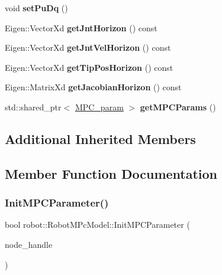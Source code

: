 \begin{DoxyCompactItemize}
void {\bfseries set\+Pu\+Dq} ()
\item 
\mbox{\label{classrobot_1_1_robot_m_pc_model_af5e8ec74e912741c4a0c51d5b06b8e5b}} 
Eigen\+::\+Vector\+Xd {\bfseries get\+Jnt\+Horizon} () const
\item 
\mbox{\label{classrobot_1_1_robot_m_pc_model_a1988ea2ad3f980211b70ed941dc12abc}} 
Eigen\+::\+Vector\+Xd {\bfseries get\+Jnt\+Vel\+Horizon} () const
\item 
\mbox{\label{classrobot_1_1_robot_m_pc_model_aeaf76924dc1770af2907a307f6884011}} 
Eigen\+::\+Vector\+Xd {\bfseries get\+Tip\+Pos\+Horizon} () const
\item 
\mbox{\label{classrobot_1_1_robot_m_pc_model_a1ac879f58cc1181388e1938ed64d8029}} 
Eigen\+::\+Matrix\+Xd {\bfseries get\+Jacobian\+Horizon} () const
\item 
\mbox{\label{classrobot_1_1_robot_m_pc_model_a373adb05c06bb6cce280dc9aa3980167}} 
std\+::shared\+\_\+ptr$<$ \hyperlink{structrobot_1_1_m_p_c__param}{M\+P\+C\+\_\+param} $>$ {\bfseries get\+M\+P\+C\+Params} ()
\end{DoxyCompactItemize}
\subsection*{Additional Inherited Members}


\subsection{Member Function Documentation}
\mbox{\label{classrobot_1_1_robot_m_pc_model_ac8379e021bfb668187bb8f522185f528}} 
\subsubsection{\texorpdfstring{Init\+M\+P\+C\+Parameter()}{InitMPCParameter()}}
{\footnotesize\ttfamily bool robot\+::\+Robot\+M\+Pc\+Model\+::\+Init\+M\+P\+C\+Parameter (\begin{DoxyParamCaption}\item[{ros\+::\+Node\+Handle \&}]{node\+\_\+handle }\end{DoxyParamCaption})}



